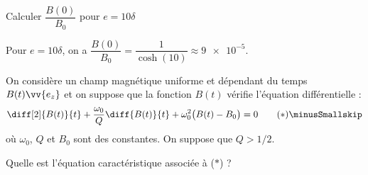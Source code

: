 \begin{enonce}
Calculer $\dfrac{B(0)}{B_0}$ pour $e=10 \delta$
\end{enonce}


\begin{corrige}
Pour $e=10\delta$, on a $\dfrac{B(0)}{B_{0}}=\dfrac{1}{\cosh(10)}\approx \num{9 e-5}$.
\end{corrige}



\finEntrainement







\hauteurLargeurCadreReponse		{7mm}{7cm}
\initialisationEntrainement

\debutEntrainement

On considère un champ magnétique uniforme et dépendant du temps $B(t)\vv{e_z}$ et on suppose que la fonction $B(t)$ vérifie l'équation différentielle : \minusSmallskip
\[
\diff[2]{B(t)}{t}+\dfrac{\omega_{0}}{Q} \diff{B(t)}{t} + \omega_{0}^{2}\big(B(t)-B_{0}\big)=0 \tag{$\ast$}\minusSmallskip
\]
où $\omega_{0}$, $Q$ et $B_{0}$ sont des constantes. On suppose que $Q > 1/2$.



\begin{enonce}
Quelle est l'équation caractéristique associée à ($\ast$) ?
\end{enonce}

